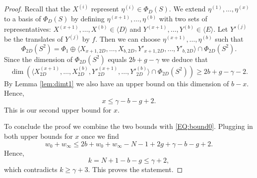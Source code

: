 \documentclass[12pt]{amsart}
\renewcommand{\leq}{\leqslant}
\renewcommand{\geq}{\geqslant}
\theoremstyle{definition}
\newcommand{\divi}[1]{\langle #1 \rangle}
\begin{document}
\begin{proof}
		Recall that the $X^{(i)}$ represent $\eta^{(i)} \in \Phi_D(S)$. We extend $\eta^{(1)}, \ldots, \eta^{(x)}$ to a basis of $\Phi_D(S)$ by defining $\eta^{(x+1)}, \ldots, \eta^{(b)}$ with two sets of representatives: $X^{(x+1)}, \ldots, X^{(b)} \in \divi {D}$ and $Y^{(x+1)}, \ldots, Y^{(b)} \in \divi {E}$. Let $Y'^{(j)}$ be the translates of $Y^{(j)}$ by $f$. Then we can choose $\eta^{(x+1)}, \ldots, \eta^{(b)}$ such that 
		$$\Phi_{2D}(S^2) = \Phi_1 \oplus \langle X_{x+1,2D}, \ldots, X_{b,2D}, Y'_{x+1,2D}, \ldots, Y'_{b,2D} \rangle \cap \Phi_{2D}(S^2).$$ 
		Since the dimension of $\Phi_{2D}(S^2)$ equals $2b + g - \gamma$ we deduce that
		$$\dim \left(\langle X^{(x+1)}_{2D}, \ldots, X^{(b)}_{2D}, Y'^{(x+1)}_{2D}, \ldots, Y'^{(b)}_{2D} \rangle \cap \Phi_{2D}(S^2) \right) \geq 2b + g - \gamma - 2.$$ 
		By Lemma \ref{lem:dimt1} we also have an upper bound on this dimension of $b-x$. Hence,
		$$x \leq \gamma - b - g + 2.$$ 
		This is our second upper bound for $x$. 
		
		To conclude the proof we combine the two bounds with \eqref{EQ:bound0}. Plugging in both upper bounds for $x$ once we find
		$$w_0 + w_\infty \leq 2b + w_0 + w_\infty - N - 1 + 2g + \gamma - b - g + 2.$$ 
		Hence, 
		$$k = N+1 - b - g \leq \gamma + 2,$$
		which contradicts $k \geq \gamma + 3$. This proves the statement.
	\end{proof}
	
	
	\printbibliography
\end{document}
